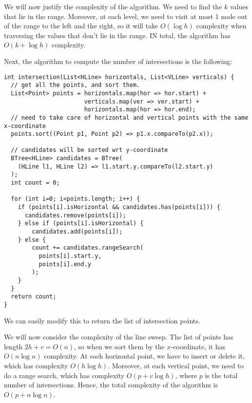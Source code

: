 \documentclass[a4paper, openany]{memoir}
\begin{document}
We will now justify the complexity of the algorithm. We need to find the $k$ values that lie in the range. Moreover, at each level, we need to visit at most 1 node out of the range to the left and the right, so it will take $O(\log h)$ complexity when traversing the values that don't lie in the range. IN total, the algorithm has $O(k + \log h)$ complexity.

Next, the algorithm to compute the number of intersections is the following:
\begin{lstlisting}[language=pseudocode]
int intersection(List<HLine> horizontals, List<VLine> verticals) {
  // get all the points, and sort them.
  List<Point> points = horizontals.map(hor => hor.start) + 
                       verticals.map(ver => ver.start) +
                       horizontals.map(hor => hor.end);
  // need to take care of horizontal and vertical points with the same x-coordinate
  points.sort((Point p1, Point p2) => p1.x.compareTo(p2.x));

  // candidates will be sorted wrt y-coordinate
  BTree<HLine> candidates = BTree(
    (HLine l1, HLine l2) => l1.start.y.compareTo(l2.start.y)
  );
  int count = 0;
  
  for (int i=0; i<points.length; i++) {
    if (points[i].isHorizontal && candidates.has(points[i])) {
      candidates.remove(points[i]);
    } else if (points[i].isHorizontal) {
        candidates.add(points[i]);
    } else {
        count += candidates.rangeSearch(
          points[i].start.y, 
          points[i].end.y
        );
    }
  }
  return count;
}
\end{lstlisting}
We can easily modify this to return the list of intersection points.

We will now consider the complexity of the line sweep. The list of points has length $2h + v = O(n)$, so when we sort them by the $x$-coordinate, it has $O(n \log n)$ complexity. At each horizontal point, we have to insert or delete it, which has complexity $O(h \log h)$. Moreover, at each vertical point, we need to do a range search, which has complexity $O(p + v \log h)$, where $p$ is the total number of intersections. Hence, the total complexity of the algorithm is $O(p + n \log n)$.
\end{document}

